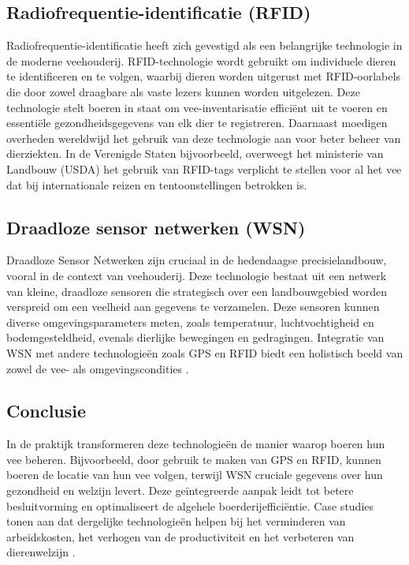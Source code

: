 \subsection{Radiofrequentie-identificatie (RFID)}
Radiofrequentie-identificatie heeft zich gevestigd als een belangrijke technologie in de moderne veehouderij. 
RFID-technologie wordt gebruikt om individuele dieren te identificeren en te volgen, waarbij dieren worden uitgerust met RFID-oorlabels die door zowel draagbare als vaste lezers kunnen worden uitgelezen. Deze technologie stelt boeren in staat om vee-inventarisatie efficiënt uit te voeren en essentiële gezondheidsgegevens van elk dier te registreren. \autocite{voulodimos2009complete}
Daarnaast moedigen overheden wereldwijd het gebruik van deze technologie aan voor beter beheer van dierziekten. 
In de Verenigde Staten bijvoorbeeld, overweegt het ministerie van Landbouw (USDA) het gebruik van RFID-tags verplicht te stellen voor al het vee dat bij internationale reizen en tentoonstellingen betrokken is​​. \autocite{rfidjournal2024rfid}

\subsection{Draadloze sensor netwerken (WSN)}
Draadloze Sensor Netwerken zijn cruciaal in de hedendaagse precisielandbouw, vooral in de context van veehouderij. Deze technologie bestaat uit een netwerk van kleine, draadloze sensoren die strategisch over een landbouwgebied worden verspreid om een veelheid aan gegevens te verzamelen. Deze sensoren kunnen diverse omgevingsparameters meten, zoals temperatuur, luchtvochtigheid en bodemgesteldheid, evenals dierlijke bewegingen en gedragingen. Integratie van WSN met andere technologieën zoals GPS en RFID biedt een holistisch beeld van zowel de vee- als omgevingscondities \autocite{oja2015wireless}.

\subsection{Conclusie}
In de praktijk transformeren deze technologieën de manier waarop boeren hun vee beheren. Bijvoorbeeld, door gebruik te maken van GPS en RFID, kunnen boeren de locatie van hun vee volgen, terwijl WSN cruciale gegevens over hun gezondheid en welzijn levert. Deze geïntegreerde aanpak leidt tot betere besluitvorming en optimaliseert de algehele boerderijefficiëntie. Case studies tonen aan dat dergelijke technologieën helpen bij het verminderen van arbeidskosten, het verhogen van de productiviteit en het verbeteren van dierenwelzijn \autocite{mohamed2021smart}.


